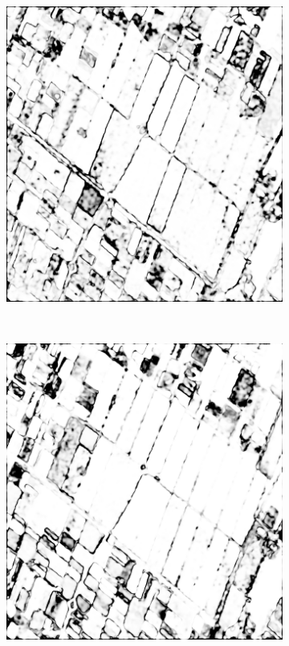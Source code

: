 \begin{figure}[tp]
\begin{subfigure}[b]{0.3\textwidth}
            \caption{}
            \label{fig:Pconf}
        \end{subfigure}
        ~
        \begin{subfigure}[b]{0.3\textwidth}
            \includegraphics[width=\textwidth]{Figures/Kron/Conf/CL}
            \caption{}
            \label{fig:CLconf}
        \end{subfigure}
      	~
    	\begin{subfigure}[b]{0.3\textwidth}
    	\includegraphics[width=\textwidth]{Figures/Kron/Conf/LP}

\end{subfigure}
\end{figure}

